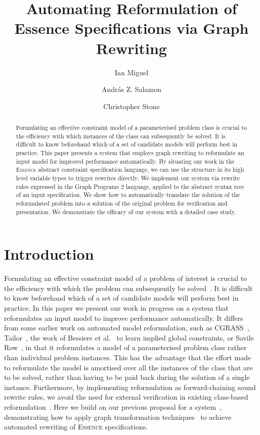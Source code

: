 \documentclass[a4paper,UKenglish,cleveref,pdfa]{lipics-v2021}
\author{Ian Miguel}%
{School of Computer Science, University of St Andrews, UK}%
{ijm@st-andrews.ac.uk}%
{https://orcid.org/0000-0002-6930-2686}%
{EPSRC grant EP/V027182/1}%
\author{András Z. Salamon}%
{School of Computer Science, University of St Andrews, UK}%
{Andras.Salamon@st-andrews.ac.uk}%
{https://orcid.org/0000-0002-1415-9712}%
{}%
\author{Christopher Stone}%
{School of Computer Science, University of St Andrews, UK}%
{cls29@st-andrews.ac.uk}%
{https://orcid.org/0000-0002-9512-9987}%
{EPSRC grant EP/V027182/1}%
\title{Automating Reformulation of Essence Specifications via Graph Rewriting
}
\newcommand{\essence}{\textsc{Essence}\xspace}
\begin{document}
\maketitle

\begin{abstract}

Formulating an effective constraint model of a parameterised problem class is crucial to the efficiency with which instances of the class can subsequently be solved. It is difficult to know beforehand which of a set of candidate models will perform best in practice. This paper presents a system that employs graph rewriting to reformulate an input model for improved performance automatically. By situating our work in the \essence abstract constraint specification language, we can use the structure in its high level variable types to trigger rewrites directly. We implement our system via rewrite rules expressed in the Graph Programs 2 language, applied to the abstract syntax tree of an input specification. We show how to automatically translate the solution of the reformulated problem into a solution of the original problem for verification and presentation. We demonstrate the efficacy of our system with a detailed case study.

\end{abstract}


\section{Introduction}

Formulating an effective constraint model of a problem of interest is crucial to the efficiency with which the problem can subsequently be solved~\cite{freuder2018:progress}. It is difficult to know beforehand which of a set of candidate models will perform best in practice. In this paper we present our work in progress on a system that reformulates an input model to improve performance automatically. It differs from some earlier work on automated model reformulation, such as {\sc CGRASS}~\cite{frisch2002cgrass}, Tailor~\cite{gent2007tailoring}, the work of Bessiere et al.~\cite{Bessiere2007:learning} to learn implied global constraints, or Savile Row~\cite{savilerow}, in that it reformulates a model of a parameterised problem class rather than individual problem instances. This has the advantage that the effort made to reformulate the model is amortised over all the instances of the class that are to be solved, rather than having to be paid back during the solution of a single instance. Furthermore, by implementing reformulation as forward-chaining sound rewrite rules, we avoid the need for external verification in existing class-based reformulation~\cite{colton2001:constraint, charnley2006:automatic, leo2022globalizing}.
Here we build on our previous proposal for a system~\cite{Miguel2023:towards}, demonstrating how to apply graph transformation techniques~\cite{icgt2024} to achieve automated rewriting of \essence specifications.
\end{document}
